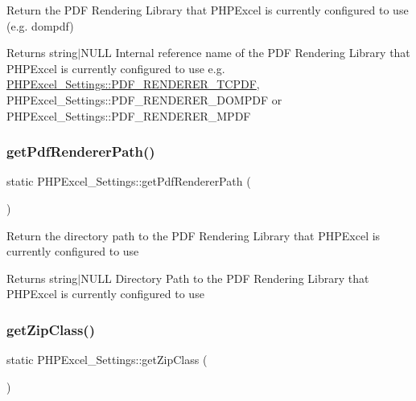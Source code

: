 Return the P\+DF Rendering Library that P\+H\+P\+Excel is currently configured to use (e.\+g. dompdf)

\begin{DoxyReturn}{Returns}
string$\vert$\+N\+U\+LL Internal reference name of the P\+DF Rendering Library that P\+H\+P\+Excel is currently configured to use e.\+g. \hyperlink{classPHPExcel__Settings_a5a636a198f88ab4429560d9b8745c8ce}{P\+H\+P\+Excel\+\_\+\+Settings\+::\+P\+D\+F\+\_\+\+R\+E\+N\+D\+E\+R\+E\+R\+\_\+\+T\+C\+P\+DF}, P\+H\+P\+Excel\+\_\+\+Settings\+::\+P\+D\+F\+\_\+\+R\+E\+N\+D\+E\+R\+E\+R\+\_\+\+D\+O\+M\+P\+DF or P\+H\+P\+Excel\+\_\+\+Settings\+::\+P\+D\+F\+\_\+\+R\+E\+N\+D\+E\+R\+E\+R\+\_\+\+M\+P\+DF 
\end{DoxyReturn}
\mbox{\label{classPHPExcel__Settings_aa92ec3129e3f2a76539dfb5209f48659}} 
\subsubsection{\texorpdfstring{get\+Pdf\+Renderer\+Path()}{getPdfRendererPath()}}
{\footnotesize\ttfamily static P\+H\+P\+Excel\+\_\+\+Settings\+::get\+Pdf\+Renderer\+Path (\begin{DoxyParamCaption}{ }\end{DoxyParamCaption})\hspace{0.3cm}{\ttfamily [static]}}

Return the directory path to the P\+DF Rendering Library that P\+H\+P\+Excel is currently configured to use

\begin{DoxyReturn}{Returns}
string$\vert$\+N\+U\+LL Directory Path to the P\+DF Rendering Library that P\+H\+P\+Excel is currently configured to use 
\end{DoxyReturn}
\mbox{\label{classPHPExcel__Settings_aac53e21ae693adafef6fee652110bdeb}} 
\subsubsection{\texorpdfstring{get\+Zip\+Class()}{getZipClass()}}
{\footnotesize\ttfamily static P\+H\+P\+Excel\+\_\+\+Settings\+::get\+Zip\+Class (\begin{DoxyParamCaption}{ }\end{DoxyParamCaption})\hspace{0.3cm}{\ttfamily [static]}}

